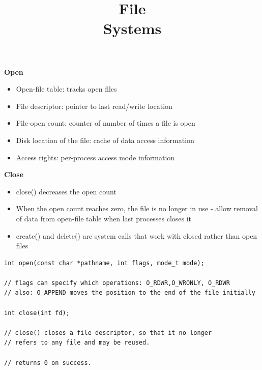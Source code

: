 

\title{File\\Systems}



\begin{frame}
    \titlepage
\end{frame}

\begin{slide}

    \textbf{Open}
    \begin{itemize}
        \item Open-file table: tracks open files
        \item File descriptor: pointer to last read/write location
        \item File-open count: counter of number of times a file is open
        \item Disk location of the file: cache of data access information
        \item Access rights: per-process access mode information
    \end{itemize}
    \medskip

    \textbf{Close}
    \begin{itemize}
        \item close() decreases the open count
        \item When the open count reaches zero, the file is no longer in use - allow removal of data from open-file table when last processes closes it
        \item create() and delete() are system calls that work with closed rather than open files
    \end{itemize}

\end{slide}

\begin{slide}


    \begin{verbatim}
int open(const char *pathname, int flags, mode_t mode);

// flags can specify which operations: O_RDWR,O_WRONLY, O_RDWR
// also: O_APPEND moves the position to the end of the file initially

int close(int fd);

// close() closes a file descriptor, so that it no longer 
// refers to any file and may be reused.

// returns 0 on success.
  \end{verbatim}
  
\end{slide}

